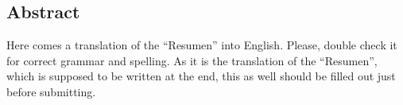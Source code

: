 \begin{otherlanguage}{english}
    \chapter*{Abstract}
  
    Here comes a translation of the ``Resumen'' into English. 
    Please, double check it for correct grammar and spelling.
    As it is the translation of the ``Resumen'', which is supposed to be written at the end, this as well should be filled out just before submitting.
   \end{otherlanguage}
\clearpage